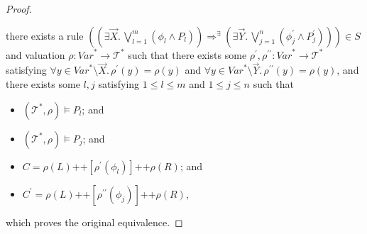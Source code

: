 \documentclass{article}
\newenvironment{proofenv}
  {
    \VerbatimEnvironment\begin{tcolorbox}[colback=black!0!white] %
  }
  {
   \end{tcolorbox}
  }
\begin{document}
\begin{proof}
\begin{proofenv}
there exists a rule $((\exists \vec{X}.\, \bigvee_{l=1}^{m} (\phi_l \land P_l)) \Rightarrow^\exists (\exists \vec{Y}.\, \bigvee_{j=1}^{n} (\phi^\prime_j \land P^\prime_j))) \in S$
and valuation $\rho : \mathit{Var}^* \to \mathcal{T}^*$ such that
there exists some $\rho^\prime,\rho^{\prime\prime} : \mathit{Var}^* \to \mathcal{T}^*$
satisfying $\forall y \in \mathit{Var}^* \setminus \vec{X}.\, \rho^\prime(y) = \rho(y)$
and $\forall y \in \mathit{Var}^* \setminus \vec{Y}.\, \rho^{\prime\prime}(y) = \rho(y)$,
and there exists some $l,j$ satisfying $1 \leq l \leq m$ and $1 \leq j \leq n$ such that
\begin{itemize}
    \item $(\mathcal{T}^*, \rho) \vDash P_l$; and
    \item $(\mathcal{T}^*, \rho) \vDash P_j$; and
    \item $C = \rho(L) \texttt{++} [\rho^\prime(\phi_l)] \texttt{++} \rho(R)$; and
    \item $C^\prime = \rho(L) \texttt{++} [\rho^{\prime\prime}(\phi_j)] 
    \texttt{++} \rho(R)$,
\end{itemize}
\end{proofenv}
which proves the original equivalence.
\end{proof}
\end{document}

